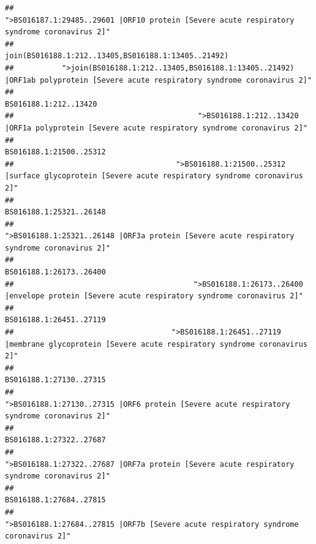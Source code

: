 \documentclass[
]{article}
\begin{document}
\begin{verbatim}
##                                            ">BS016187.1:29485..29601 |ORF10 protein [Severe acute respiratory syndrome coronavirus 2]" 
##                                                                                    join(BS016188.1:212..13405,BS016188.1:13405..21492) 
##           ">join(BS016188.1:212..13405,BS016188.1:13405..21492) |ORF1ab polyprotein [Severe acute respiratory syndrome coronavirus 2]" 
##                                                                                                                  BS016188.1:212..13420 
##                                          ">BS016188.1:212..13420 |ORF1a polyprotein [Severe acute respiratory syndrome coronavirus 2]" 
##                                                                                                                BS016188.1:21500..25312 
##                                     ">BS016188.1:21500..25312 |surface glycoprotein [Severe acute respiratory syndrome coronavirus 2]" 
##                                                                                                                BS016188.1:25321..26148 
##                                            ">BS016188.1:25321..26148 |ORF3a protein [Severe acute respiratory syndrome coronavirus 2]" 
##                                                                                                                BS016188.1:26173..26400 
##                                         ">BS016188.1:26173..26400 |envelope protein [Severe acute respiratory syndrome coronavirus 2]" 
##                                                                                                                BS016188.1:26451..27119 
##                                    ">BS016188.1:26451..27119 |membrane glycoprotein [Severe acute respiratory syndrome coronavirus 2]" 
##                                                                                                                BS016188.1:27130..27315 
##                                             ">BS016188.1:27130..27315 |ORF6 protein [Severe acute respiratory syndrome coronavirus 2]" 
##                                                                                                                BS016188.1:27322..27687 
##                                            ">BS016188.1:27322..27687 |ORF7a protein [Severe acute respiratory syndrome coronavirus 2]" 
##                                                                                                                BS016188.1:27684..27815 
##                                                    ">BS016188.1:27684..27815 |ORF7b [Severe acute respiratory syndrome coronavirus 2]" 

\end{verbatim}
\end{document}
